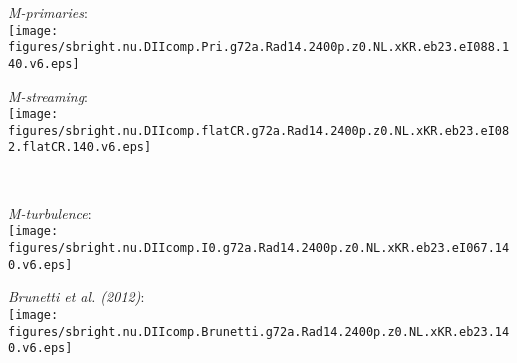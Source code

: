 \documentclass[useAMS,usenatbib]{mn2e}
\newcommand{\Mstream}{{\it M-streaming}\xspace}
\newcommand{\Mflatturb}{{\it M-turbulence}\xspace}
\newcommand{\Mprimary}{{\it M-primaries}\xspace}
\begin{document}
\begin{figure*}
\begin{minipage}{1\columnwidth}
   \begin{center}\Large{\Mprimary:}\\
     \texttt{[image: figures/sbright.nu.DIIcomp.Pri.g72a.Rad14.2400p.z0.NL.xKR.eb23.eI088.140.v6.eps]}
   \end{center}
\end{minipage}
\begin{minipage}{1\columnwidth}
   \begin{center}\Large{\Mstream:}\\
     \texttt{[image: figures/sbright.nu.DIIcomp.flatCR.g72a.Rad14.2400p.z0.NL.xKR.eb23.eI082.flatCR.140.v6.eps]}
   \end{center}
\end{minipage}
\\
\begin{minipage}{1\columnwidth}
  \begin{center}\Large{\Mflatturb:}\\ 
    \texttt{[image: figures/sbright.nu.DIIcomp.I0.g72a.Rad14.2400p.z0.NL.xKR.eb23.eI067.140.v6.eps]}
  \end{center}
\end{minipage}
\begin{minipage}{1\columnwidth}
   \begin{center}\Large{\it Brunetti et al. (2012)}:\\
     \texttt{[image: figures/sbright.nu.DIIcomp.Brunetti.g72a.Rad14.2400p.z0.NL.xKR.eb23.140.v6.eps]}
   \end{center}
\end{minipage}
\caption{Radio surface brightness profiles of Fermi-II reaccelerated
  CR electrons of a simulated post-merging cluster similar to Coma. We
  compare profiles at 352~MHz \citep[blue lines and
    crosses,][]{brown11} to those at 1.4~GHz \citep[green lines and
    crosses,][]{deiss97}. The red crosses show the reprocessed 1.4~GHz
  data, where a zero level of about 10~\% of the central value is
  adopted. The solid lines show predicted emission from a
  reaccelerated fossil population, while dotted lines show emission
  from a fossil population without reacceleration. The panels show the
  emission of our models \Mprimary (upper left panel), \Mstream (upper
  right panel), \Mflatturb (lower left panel), and simulated secondary
  electrons together with previous estimates \citep{brunetti12} for
  the Coma cluster (lower right panel).}
  \label{fig:sync_profile}
\end{figure*}
\end{document}
